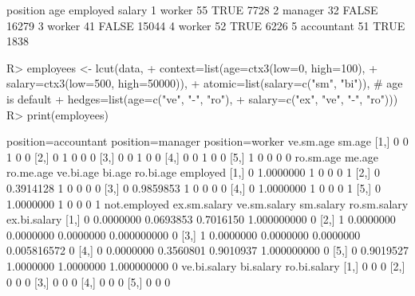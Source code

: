 \begin{Schunk}
% --begin: "lcut.data.frame2"
\begin{Soutput}
    position age employed salary
1     worker  55     TRUE   7728
2    manager  32    FALSE  16279
3     worker  41    FALSE  15044
4     worker  52     TRUE   6226
5 accountant  51     TRUE   1838
\end{Soutput}
\begin{Sinput}
R> employees <- lcut(data,
+                    context=list(age=ctx3(low=0, high=100),
+                                 salary=ctx3(low=500, high=50000)),
+                    atomic=list(salary=c("sm", "bi")), # age is default
+                    hedges=list(age=c("ve", "-", "ro"),
+                                salary=c("ex", "ve", "-", "ro")))
R> print(employees)
\end{Sinput}
\begin{Soutput}
     position=accountant position=manager position=worker ve.sm.age sm.age
[1,]                   0                0               1         0      0
[2,]                   0                1               0         0      0
[3,]                   0                0               1         0      0
[4,]                   0                0               1         0      0
[5,]                   1                0               0         0      0
     ro.sm.age    me.age ro.me.age ve.bi.age bi.age ro.bi.age employed
[1,]         0 1.0000000         1         0      0         0        1
[2,]         0 0.3914128         1         0      0         0        0
[3,]         0 0.9859853         1         0      0         0        0
[4,]         0 1.0000000         1         0      0         0        1
[5,]         0 1.0000000         1         0      0         0        1
     not.employed ex.sm.salary ve.sm.salary sm.salary ro.sm.salary ex.bi.salary
[1,]            0    0.0000000    0.0693853 0.7016150  1.000000000            0
[2,]            1    0.0000000    0.0000000 0.0000000  0.000000000            0
[3,]            1    0.0000000    0.0000000 0.0000000  0.005816572            0
[4,]            0    0.0000000    0.3560801 0.9010937  1.000000000            0
[5,]            0    0.9019527    1.0000000 1.0000000  1.000000000            0
     ve.bi.salary bi.salary ro.bi.salary
[1,]            0         0            0
[2,]            0         0            0
[3,]            0         0            0
[4,]            0         0            0
[5,]            0         0            0
\end{Soutput}
%
% --end: "lcut.data.frame2"
\end{Schunk}
